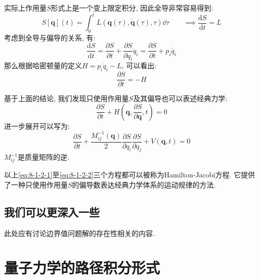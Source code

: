        实际上作用量$S$形式上是一个变上限定积分, 因此全导非常容易得到: 
        \begin{equation}
            S[\bm q](t) = \int_{0}^{t} L( \bm q(\tau), \bm \dot q(\tau), \tau ) \dd \tau
            \qquad \implies \frac{\mathrm{d} S}{\mathrm{d} t} = L
        \end{equation}
        考虑到全导与偏导的关系, 有:
        \begin{equation}
            \frac{\mathrm{d} S}{\mathrm{d} t} = \frac{\partial S}{\partial t} + \frac{\partial S}{\partial q_i} \dot{q}_i = \frac{\partial S}{\partial t} + p_i\dot{q}_i
        \end{equation}
        那么根据哈密顿量的定义$H = p_i \dot q_i - L$, 可以看出:
        \begin{equation}\label{eq:8-1-2-1}
            \frac{\partial S}{\partial t} = - H
        \end{equation}

        基于上面的结论, 我们发现只使用作用量$S$及其偏导也可以表述经典力学: 
        \begin{equation}
            \frac{\partial S}{\partial t} + H(\bm q, \frac{\partial S}{\partial \bm q}, t) = 0
        \end{equation}
        进一步展开可以写为:
        \begin{equation}\label{eq:8-1-2-2}
            \frac{\partial S}{\partial t} + \frac{M^{-1}_{ij}(\bm q)}{2} \frac{\partial S}{\partial q_i}\frac{\partial S}{\partial q_j} + V(\bm q, t) = 0
        \end{equation}
        $M^{-1}_{ij}$是质量矩阵的逆. 

        以上\ref{eq:8-1-2-1}至\ref{eq:8-1-2-2}三个方程都可以被称为Hamilton-Jacobi方程. 它提供了一种只使用作用量$S$的偏导数表达经典力学体系的运动规律的方法.

        \subsection{我们可以更深入一些}

        此处应有讨论边界值问题解的存在性相关的内容.

    \section{量子力学的路径积分形式}

